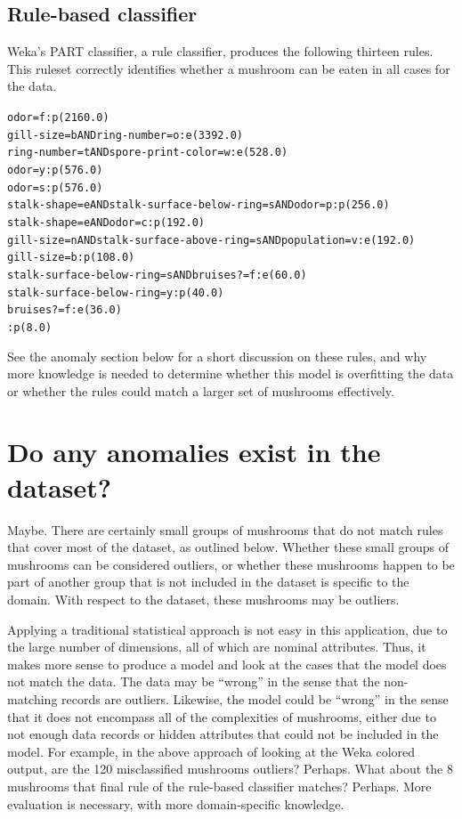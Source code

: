 \documentclass[margin,letterpaper,11pt]{scrartcl}
\begin{document}
\subsection{Rule-based classifier}

Weka's PART classifier, a rule classifier, produces the following thirteen
rules. This ruleset correctly identifies whether a mushroom can be eaten in
all cases for the data.

\begin{alltt}
odor = f: p (2160.0)
gill-size = b AND ring-number = o: e (3392.0)
ring-number = t AND spore-print-color = w: e (528.0)
odor = y: p (576.0)
odor = s: p (576.0)
stalk-shape = e AND stalk-surface-below-ring = s AND odor = p: p (256.0)
stalk-shape = e AND odor = c: p (192.0)
gill-size = n AND stalk-surface-above-ring = s AND population = v: e (192.0)
gill-size = b: p (108.0)
stalk-surface-below-ring = s AND bruises? = f: e (60.0)
stalk-surface-below-ring = y: p (40.0)
bruises? = f: e (36.0)
: p (8.0)
\end{alltt}

See the anomaly section below for a short discussion on these rules, and why
more knowledge is needed to determine whether this model is overfitting the
data or whether the rules could match a larger set of mushrooms effectively.

\section{Do any anomalies exist in the dataset?}

Maybe. There are certainly small groups of mushrooms that do not match rules that
cover most of the dataset, as outlined below. Whether these small groups of
mushrooms can be considered outliers, or whether these mushrooms happen to be
part of another group that is not included in the dataset is specific to the
domain. With respect to the dataset, these mushrooms may be outliers.

Applying a traditional statistical approach is not easy in this application,
due to the large number of dimensions, all of which are nominal attributes.
Thus, it makes more sense to produce a model and look at the cases that the
model does not match the data. The data may be ``wrong'' in the sense that the
non-matching records are outliers. Likewise, the model could be ``wrong'' in
the sense that it does not encompass all of the complexities of mushrooms,
either due to not enough data records or hidden attributes that could not be
included in the model. For example, in the above approach of looking at the
Weka colored output, are the 120 misclassified mushrooms outliers? Perhaps.
What about the 8 mushrooms that final rule of the rule-based classifier
matches? Perhaps. More evaluation is necessary, with more domain-specific
knowledge.
\end{document}
